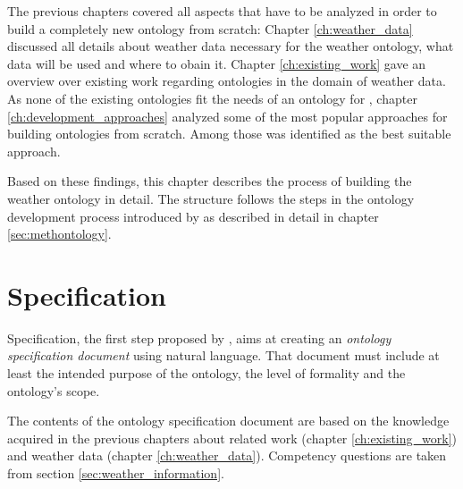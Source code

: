 




The previous chapters covered all aspects that have to be analyzed in order to build a completely new ontology from scratch: Chapter \ref{ch:weather_data} discussed all details about weather data necessary for the \thinkhome weather ontology, what data will be used and where to obain it. Chapter \ref{ch:existing_work} gave an overview over existing work regarding ontologies in the domain of weather data. As none of the existing ontologies fit the needs of an ontology for \thinkhome, chapter  \ref{ch:development_approaches} analyzed some of the most popular approaches for building ontologies from scratch. Among those \methontology was identified as the best suitable approach. %

Based on these findings, this chapter describes the process of building the \thinkhome weather ontology in detail. The structure follows the steps in the ontology development process introduced by \methontology as described in detail in chapter \ref{sec:methontology}.

\section{Specification}
\label{sec:ontology_specification}

Specification, the first step proposed by \methontology, aims at creating an \emph{ontology specification document} using natural language. That document must include at least the intended purpose of the ontology, the level of 
formality and the ontology's scope.

The contents of the ontology specification document are based on the knowledge acquired in the previous chapters about related work (chapter \ref{ch:existing_work}) and weather data (chapter \ref{ch:weather_data}). Competency questions are taken from section \ref{sec:weather_information}.

